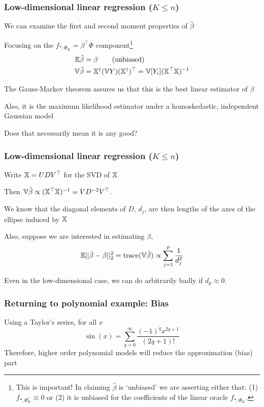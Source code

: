 \documentclass{beamer}
\begin{document}
\begin{frame}
\frametitle{Low-dimensional linear regression ($K \leq n$)}
We can examine the first and second moment properties of $\hat\beta$

Focusing on the $f_{*,\Phi_K} = \beta^{\top}\Phi$ component\footnote{This is important! In claiming $\hat\beta$ is 
`unbiased' we are asserting either that: (1)  $f_{*,\Phi_K^c} \equiv 0$ or (2) it is unbiased for the coefficients of
the linear oracle $f_{*,\Phi_K}$.} 
\begin{align}
\label{eq:bias}
\mathbb{E} \hat\beta  & =  \beta \qquad (\textrm{unbiased})\\
\label{eq:var}
\mathbb{V} \hat\beta  & =  \mathbb{X}^{\dagger} (\mathbb{V} Y) (\mathbb{X}^{\dagger})^{\top}  = \mathbb{V}[Y_i] (\mathbb{X}^{\top}\mathbb{X})^{-1} 
\end{align}

The Gauss-Markov theorem assures us that this is the best linear  estimator of $\beta$


\vsp
Also, it is the maximum likelihood estimator under a homoskedastic, independent Gaussian model

\vsp

Does that necessarily mean it is any good?
\end{frame}

\begin{frame}
\frametitle{Low-dimensional linear regression ($K \leq n$)}
Write $\mathbb{X} = U D V^{\top}$ for the SVD of $\mathbb{X}$
\vsp

Then $\mathbb{V} \hat\beta \propto (\mathbb{X}^{\top}\mathbb{X})^{-1}  = V D^{-2} V^{\top}$.
\vsp

We know that the diagonal elements of $D$, $d_j$, are then lengths of the axes of the ellipse induced by $\mathbb{X}$
\vsp

Also, suppose we are interested in estimating $\beta$,
\[
\mathbb{E}|| \hat\beta - \beta||_2^2  =  \textrm{trace}(\mathbb{V}\hat\beta) \propto \sum_{j=1}^p \frac{1}{d_j^2}
\]
\vsp

Even in the low-dimensional case, we can do arbitrarily badly if $d_p \approx 0$.
\end{frame}


\begin{frame}
\frametitle{Returning to polynomial example: Bias}
Using a Taylor's series, for all $x$
\[
\sin(x) = \sum_{q = 0}^\infty \frac{(-1)^qx^{2q+1}}{(2q + 1)!} 
\]
Therefore, higher order polynomial models will reduce the approximation (bias) part
\end{frame}
\end{document}
